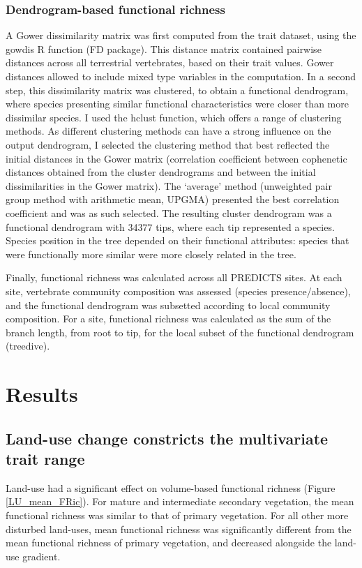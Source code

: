 \subsubsection{Dendrogram-based functional richness}
A Gower dissimilarity matrix was first computed from the trait dataset, using the gowdis R function (FD package). This distance matrix contained pairwise distances across all terrestrial vertebrates, based on their trait values. Gower distances allowed to include mixed type variables in the computation. In a second step, this dissimilarity matrix was clustered, to obtain a functional dendrogram, where species presenting similar functional characteristics were closer than more dissimilar species. I used the hclust function, which offers a range of clustering methods. As different clustering methods can have a strong influence on the output dendrogram, I selected the clustering method that best reflected the initial distances in the Gower matrix (correlation coefficient between cophenetic distances obtained from the cluster dendrograms and between the initial dissimilarities in the Gower matrix). The `average' method (unweighted pair group method with arithmetic mean, UPGMA) presented the best correlation coefficient and was as such selected. The resulting cluster dendrogram was a functional dendrogram with 34377 tips, where each tip represented a species. Species position in the tree depended on their functional attributes: species that were functionally more similar were more closely related in the tree.

Finally, functional richness was calculated across all PREDICTS sites. At each site, vertebrate community composition was assessed (species presence/absence), and the functional dendrogram was subsetted according to local community composition. For a site, functional richness was calculated as the sum of the branch length, from root to tip, for the local subset of the functional dendrogram (treedive).


\section{Results}

\subsection{Land-use change constricts the multivariate trait range}
Land-use had a significant effect on volume-based functional richness (Figure \ref{LU_mean_FRic}). For mature and intermediate secondary vegetation, the mean functional richness was similar to that of primary vegetation. For all other more disturbed land-uses, mean functional richness was significantly different from the mean functional richness of primary vegetation, and decreased alongside the land-use gradient. 

